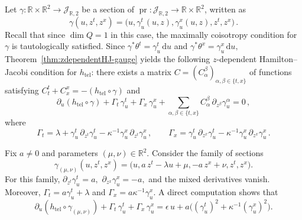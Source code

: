 \documentclass[11pt,twoside]{article}
\theoremstyle{plain}
\theoremstyle{definition}
\theoremstyle{remark}
\newcommand{\dd}{\mathrm{d}}
\begin{document}
Let
\(
\gamma\colon \mathbb R\times \mathbb R^2\to \mathcal J_{\mathbb R,2}
\)
be a section of
\(
\operatorname{pr}\colon \mathcal J_{\mathbb R,2}\to \mathbb R\times \mathbb R^2
\),
written as
\[
\gamma(u,z^t,z^x)=\bigl(u,\gamma_u^t(u,z),\gamma_u^x(u,z),z^t,z^x\bigr)\,.
\]
Recall that since $\dim Q=1$ in this case, the maximally coisotropy condition for $\gamma$ is tautologically satisfied. 
Since
\(
\gamma^*\theta^t=\gamma_u^t\,\dd u
\)
and
\(
\gamma^*\theta^x=\gamma_u^x\,\dd u,
\)
Theorem~\ref{thm:zdependentHJ-gauge} yields the following $z$-dependent Hamilton--Jacobi condition for
\(h_{\mathrm{tel}}\): there exists a matrix
\(
C=(C_\alpha^{\beta})_{\alpha,\beta\in\{t,x\}}
\)
of  functions satisfying
\(
C_t^t+C_x^x=-(h_{\mathrm{tel}}\circ\gamma)
\)
and
\begin{equation}\label{eq:HJ-tel-standard}
\partial_u(h_{\mathrm{tel}}\circ\gamma)+\Gamma_t\,\gamma_u^t+\Gamma_x\,\gamma_u^x
+\sum_{\alpha,\beta\in\{t,x\}} C_\alpha^{\beta}\,\partial_{z^\beta}\gamma_u^\alpha=0\,,
\end{equation}
where
\begin{equation}\label{eq:Gamma-tel-standard}
\Gamma_t=\lambda+\gamma_u^t\,\partial_{z^t}\gamma_u^t-\kappa^{-1}\gamma_u^x\,\partial_{z^t}\gamma_u^x\,,
\qquad
\Gamma_x=\gamma_u^t\,\partial_{z^x}\gamma_u^t-\kappa^{-1}\gamma_u^x\,\partial_{z^x}\gamma_u^x\,.
\end{equation}

Fix \(a\neq0\) and parameters \((\mu,\nu)\in\mathbb R^2\). Consider the family of sections
\begin{equation}\label{eq:gamma-zdep-family}
\gamma_{(\mu,\nu)}(u,z^t,z^x)
=
\bigl(u,a\,z^t-\lambda u+\mu,-a\,z^x+\nu,z^t,z^x\bigr).
\end{equation}
For this family,
\(
\partial_{z^t}\gamma_u^t=a,
\)
\(
\partial_{z^x}\gamma_u^x=-a,
\)
and the mixed derivatives vanish. Moreover,
\(
\Gamma_t=a\gamma_u^t+\lambda
\)
and
\(
\Gamma_x=a\kappa^{-1}\gamma_u^x.
\)
A direct computation shows that
\[
\partial_u(h_{\mathrm{tel}}\circ\gamma_{(\mu,\nu)})+\Gamma_t\,\gamma_u^t+\Gamma_x\,\gamma_u^x
=
\epsilon\,u+a\bigl((\gamma_u^t)^2+\kappa^{-1}(\gamma_u^x)^2\bigr).
\]
\end{document}
